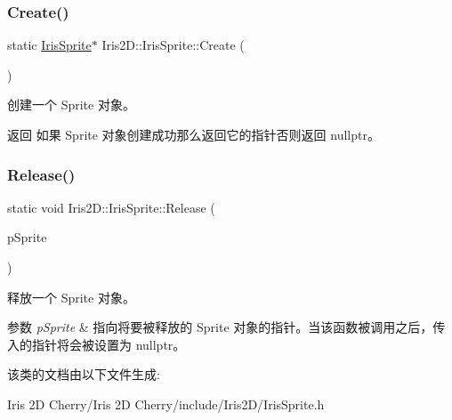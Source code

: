 \subsubsection{\texorpdfstring{Create()}{Create()}}
{\footnotesize\ttfamily static \hyperlink{class_iris2_d_1_1_iris_sprite}{Iris\+Sprite}$\ast$ Iris2\+D\+::\+Iris\+Sprite\+::\+Create (\begin{DoxyParamCaption}{ }\end{DoxyParamCaption})\hspace{0.3cm}{\ttfamily [static]}}



创建一个 Sprite 对象。 

\begin{DoxyReturn}{返回}
如果 Sprite 对象创建成功那么返回它的指针否则返回 nullptr。 
\end{DoxyReturn}
\mbox{\label{class_iris2_d_1_1_iris_sprite_aa225c6483e0282375187b092ea0cecf9}} 
\subsubsection{\texorpdfstring{Release()}{Release()}}
{\footnotesize\ttfamily static void Iris2\+D\+::\+Iris\+Sprite\+::\+Release (\begin{DoxyParamCaption}\item[{\hyperlink{class_iris2_d_1_1_iris_sprite}{Iris\+Sprite} $\ast$\&}]{p\+Sprite }\end{DoxyParamCaption})\hspace{0.3cm}{\ttfamily [static]}}



释放一个 Sprite 对象。 


\begin{DoxyParams}{参数}
{\em p\+Sprite} & 指向将要被释放的 Sprite 对象的指针。当该函数被调用之后，传入的指针将会被设置为 nullptr。 \\
\hline
\end{DoxyParams}


该类的文档由以下文件生成\+:\begin{DoxyCompactItemize}
\item 
Iris 2\+D Cherry/\+Iris 2\+D Cherry/include/\+Iris2\+D/Iris\+Sprite.\+h\end{DoxyCompactItemize}
